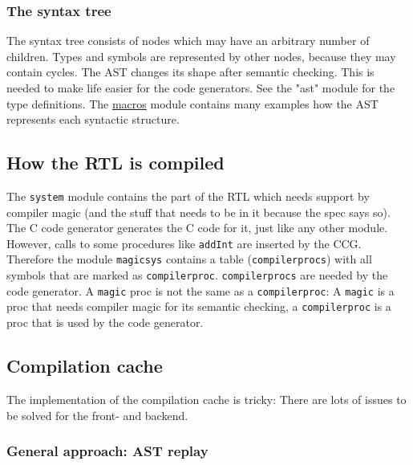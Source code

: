 \hypertarget{the-syntax-tree}{%
\subsubsection{The syntax tree}\label{the-syntax-tree}}

The syntax tree consists of nodes which may have an arbitrary number of
children. Types and symbols are represented by other nodes, because they
may contain cycles. The AST changes its shape after semantic checking.
This is needed to make life easier for the code generators. See the
"ast" module for the type definitions. The \href{macros.html}{macros}
module contains many examples how the AST represents each syntactic
structure.

\hypertarget{how-the-rtl-is-compiled}{%
\subsection{How the RTL is compiled}\label{how-the-rtl-is-compiled}}

The \texttt{system} module contains the part of the RTL which needs
support by compiler magic (and the stuff that needs to be in it because
the spec says so). The C code generator generates the C code for it,
just like any other module. However, calls to some procedures like
\texttt{addInt} are inserted by the CCG. Therefore the module
\texttt{magicsys} contains a table (\texttt{compilerprocs}) with all
symbols that are marked as \texttt{compilerproc}. \texttt{compilerprocs}
are needed by the code generator. A \texttt{magic} proc is not the same
as a \texttt{compilerproc}: A \texttt{magic} is a proc that needs
compiler magic for its semantic checking, a \texttt{compilerproc} is a
proc that is used by the code generator.

\hypertarget{compilation-cache}{%
\subsection{Compilation cache}\label{compilation-cache}}

The implementation of the compilation cache is tricky: There are lots of
issues to be solved for the front- and backend.

\hypertarget{general-approach-ast-replay}{%
\subsubsection{General approach: AST
replay}\label{general-approach-ast-replay}}

